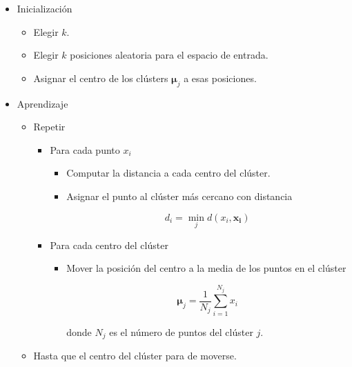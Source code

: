 \begin{itemize}
\item Inicialización

\begin{itemize}
\item Elegir $k$.
\item Elegir $k$ posiciones aleatoria para el espacio de entrada.
\item Asignar el centro de los clústers $\mathbf{\mu}_j$ a esas posiciones.
\end{itemize}

\item Aprendizaje

\begin{itemize}
\item Repetir

\begin{itemize}
\item Para cada punto $x_i$

\begin{itemize}
\item Computar la distancia a cada centro del clúster.
\item Asignar el punto al clúster más cercano con distancia

\begin{equation}
d_i = \min_j d(x_i, \mathbf{x_i})
\end{equation}
\end{itemize}

\item Para cada centro del clúster

\begin{itemize}
\item Mover la posición del centro a la media de los puntos en el clúster

\begin{equation}
\mathbf{\mu}_j = \dfrac{1}{N_j} \sum_{i=1}^{N_j} x_i
\end{equation}

donde $N_j$ es el número de puntos del clúster $j$.
\end{itemize}

\end{itemize}

\item Hasta que el centro del clúster para de moverse.

\end{itemize}

\end{itemize}  


